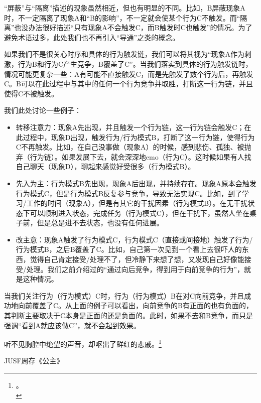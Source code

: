 \begin{explain}
“屏蔽”与“隔离”描述的现象虽然相近，但也有明显的不同。比如，B屏蔽现象A时，不一定隔离了现象A和“B的影响”，不一定就会使某个行为C不触发。而“隔离”也没办法很好描述“只有现象A不会触发C，而B触发时C也触发”的情况。为了避免术语过多，此处我们也不再引入“导通”之类的概念。

如果我们不是很关心时序和具体的行为触发链，我们可以将其视为“现象A作为刺激，行为B和行为C产生竞争，B覆盖了C”。当我们落实到具体的行为触发链时，情况可能更复杂一些：A有可能不直接触发C，而是先触发了数个行为后，再触发C。B可以在此过程中与其中的任何一个行为竞争并取胜，打断这一行为链，并且使得C不被触发。

我们此处讨论一些例子：
\begin{itemize}
\item 转移注意力：现象A先出现，并且触发一个行为链，这一行为链会触发C；在此过程中，现象D出现，触发行为/行为模式B，打断了这一行为链，使得行为C不再触发。比如，在自己没事做（现象A）的时候，感到悲伤、孤独、被抛弃（行为链）。如果发展下去，就会深深地emo（行为C）。这时候如果有人找自己聊天（现象D），聊起来感觉好受很多（行为模式B）。
\item 先入为主：行为模式B先出现，现象A后出现，并持续存在。现象A原本会触发行为模式C，但是行为模式B反复参与竞争，导致无法实现C。比如，到了学习/工作的时间（现象A），但是有其它的干扰因素（行为模式B）。在无干扰状态下可以顺利进入状态，完成任务（行为模式C），但在干扰下，虽然人坐在桌子前，但是总是进不去状态，也没有任何进展。
\item 改主意：现象A触发了行为模式C，行为模式C（直接或间接地）触发了行为/行为模式B，之后B覆盖了C。比如，自己第一次见到一个看上去很吓人的东西，觉得自己肯定接受/处理不了，但冷静下来想了想，又发现自己好像能接受/处理。我们之前介绍过的“通过向后竞争，得到用于向前竞争的行为”，就是这种情况。
\end{itemize}
\insertparanotes
当我们关注行为（行为模式）C时，行为（行为模式）B在对C向前竞争，并且成功地向前覆盖了C。从上面的例子可以看出，向前竞争的B有正面的也有负面的，其判断主要取决于C本身是正面的还是负面的。此时，如果不去和B竞争，而只是强调“看到A就应该做C”，就不会起到效果。
\end{explain}

\hfill\begin{minipage}{0.6\textwidth}
\fontsize{8pt}{12pt}\selectfont\fontsize{8pt}{12pt}

\raggedright 听不见胸腔中绝望的声音，却呕出了鲜红的悲戚。\footnote{。\\}

\raggedleft JUSF周存《公主》
\end{minipage}

